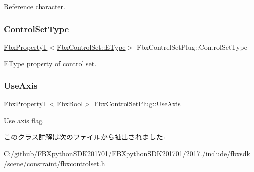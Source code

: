 Reference character. 

\mbox{\label{class_fbx_control_set_plug_ac721dfc2da9b51b8a90c1df5f679e496}} 
\subsubsection{\texorpdfstring{Control\+Set\+Type}{ControlSetType}}
{\footnotesize\ttfamily \hyperlink{class_fbx_property_t}{Fbx\+PropertyT}$<$\hyperlink{class_fbx_control_set_a13a51702c46fff33d50c05d20f3d9f04}{Fbx\+Control\+Set\+::\+E\+Type}$>$ Fbx\+Control\+Set\+Plug\+::\+Control\+Set\+Type}



E\+Type property of control set. 

\mbox{\label{class_fbx_control_set_plug_a037aaf41be834256757d7bf874d7531b}} 
\subsubsection{\texorpdfstring{Use\+Axis}{UseAxis}}
{\footnotesize\ttfamily \hyperlink{class_fbx_property_t}{Fbx\+PropertyT}$<$\hyperlink{fbxtypes_8h_a92e0562b2fe33e76a242f498b362262e}{Fbx\+Bool}$>$ Fbx\+Control\+Set\+Plug\+::\+Use\+Axis}



Use axis flag. 



このクラス詳解は次のファイルから抽出されました\+:\begin{DoxyCompactItemize}
\item 
C\+:/github/\+F\+B\+Xpython\+S\+D\+K201701/\+F\+B\+Xpython\+S\+D\+K201701/2017./include/fbxsdk/scene/constraint/\hyperlink{fbxcontrolset_8h}{fbxcontrolset.\+h}\end{DoxyCompactItemize}
